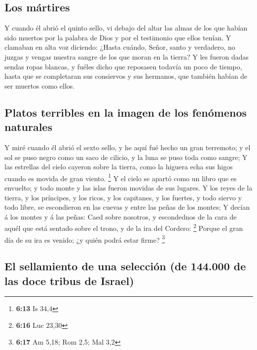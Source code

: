 \hypertarget{los-muxe1rtires}{%
\subsection{Los mártires}\label{los-muxe1rtires}}

 Y cuando él abrió el quinto sello, vi debajo del altar las
almas de los que habían sido muertos por la palabra de Dios y por el
testimonio que ellos tenían.  Y clamaban en alta voz
diciendo: ¿Hasta cuándo, Señor, santo y verdadero, no juzgas y vengas
nuestra sangre de los que moran en la tierra?  Y les fueron
dadas sendas ropas blancas, y fuéles dicho que reposasen todavía un poco
de tiempo, hasta que se completaran sus consiervos y sus hermanos, que
también habían de ser muertos como ellos.

\hypertarget{platos-terribles-en-la-imagen-de-los-fenuxf3menos-naturales}{%
\subsection{Platos terribles en la imagen de los fenómenos
naturales}\label{platos-terribles-en-la-imagen-de-los-fenuxf3menos-naturales}}

 Y miré cuando él abrió el sexto sello, y he aquí fué hecho
un gran terremoto; y el sol se puso negro como un saco de cilicio, y la
luna se puso toda como sangre;  Y las estrellas del cielo
cayeron sobre la tierra, como la higuera echa sus higos cuando es movida
de gran viento. \footnote{\textbf{6:13} Is 34,4}  Y el
cielo se apartó como un libro que es envuelto; y todo monte y las islas
fueron movidas de sus lugares.  Y los reyes de la tierra, y
los príncipes, y los ricos, y los capitanes, y los fuertes, y todo
siervo y todo libre, se escondieron en las cuevas y entre las peñas de
los montes;  Y decían á los montes y á las peñas: Caed
sobre nosotros, y escondednos de la cara de aquél que está sentado sobre
el trono, y de la ira del Cordero: \footnote{\textbf{6:16} Luc 23,30}
 Porque el gran día de su ira es venido; ¿y quién podrá
estar firme? \footnote{\textbf{6:17} Am 5,18; Rom 2,5; Mal 3,2}

\hypertarget{el-sellamiento-de-una-selecciuxf3n-de-144.000-de-las-doce-tribus-de-israel}{%
\subsection{El sellamiento de una selección (de 144.000 de las doce
tribus de
Israel)}\label{el-sellamiento-de-una-selecciuxf3n-de-144.000-de-las-doce-tribus-de-israel}}

